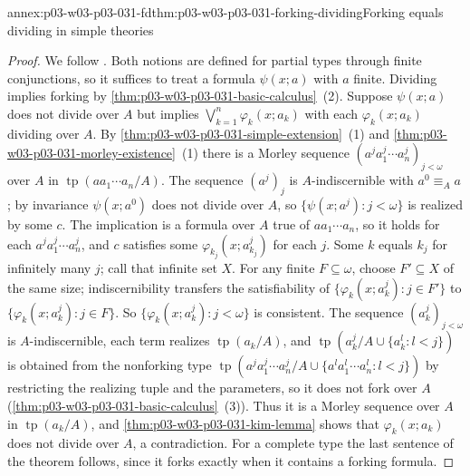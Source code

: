 \begin{annexitem}{annex:p03-w03-p03-031-fd}{thm:p03-w03-p03-031-forking-dividing}{Forking equals dividing in simple theories}
\begin{proof}
We follow \cite[Proposition~5.4, p.~272]{Casanovas2007Simplicity}.  Both
notions are defined for partial types through finite conjunctions, so it
suffices to treat a formula \(\psi(x;a)\) with \(a\) finite.  Dividing
implies forking by \cref{thm:p03-w03-p03-031-basic-calculus}~(2).
Suppose \(\psi(x;a)\) does not divide over \(A\) but implies
\(\bigvee_{k=1}^n\varphi_k(x;a_k)\) with each \(\varphi_k(x;a_k)\)
dividing over \(A\).  By \cref{thm:p03-w03-p03-031-simple-extension}~(1)
and \cref{thm:p03-w03-p03-031-morley-existence}~(1) there is a Morley
sequence \((a^ja^j_1\cdots a^j_n)_{j<\omega}\) over \(A\) in
\(\operatorname{tp}(aa_1\cdots a_n/A)\).  The sequence \((a^j)_j\) is
\(A\)-indiscernible with \(a^0\equiv_Aa\); by invariance
\(\psi(x;a^0)\) does not divide over \(A\), so
\(\{\psi(x;a^j):j<\omega\}\) is realized by some \(c\).  The implication
is a formula over \(A\) true of \(aa_1\cdots a_n\), so it holds for each
\(a^ja^j_1\cdots a^j_n\), and \(c\) satisfies some
\(\varphi_{k_j}(x;a^j_{k_j})\) for each \(j\).  Some \(k\) equals
\(k_j\) for infinitely many \(j\); call that infinite set \(X\).  For any
finite \(F\subseteq\omega\), choose \(F'\subseteq X\) of the same size;
indiscernibility transfers the satisfiability of
\(\{\varphi_k(x;a^j_k):j\in F'\}\) to
\(\{\varphi_k(x;a^j_k):j\in F\}\).  So
\(\{\varphi_k(x;a^j_k):j<\omega\}\) is consistent.  The sequence
\((a^j_k)_{j<\omega}\) is \(A\)-indiscernible, each term realizes
\(\operatorname{tp}(a_k/A)\), and
\(\operatorname{tp}(a^j_k/A\cup\{a^l_k:l<j\})\) is obtained from the
nonforking type
\(\operatorname{tp}(a^ja^j_1\cdots a^j_n/A\cup\{a^la^l_1\cdots a^l_n:l<j\})\)
by restricting the realizing tuple and the parameters, so it does not fork
over \(A\) (\cref{thm:p03-w03-p03-031-basic-calculus}~(3)).  Thus it is a
Morley sequence over \(A\) in \(\operatorname{tp}(a_k/A)\), and
\cref{thm:p03-w03-p03-031-kim-lemma} shows that \(\varphi_k(x;a_k)\) does
not divide over \(A\), a contradiction.  For a complete type the last
sentence of the theorem follows, since it forks exactly when it contains a
forking formula.
\end{proof}
\end{annexitem}

